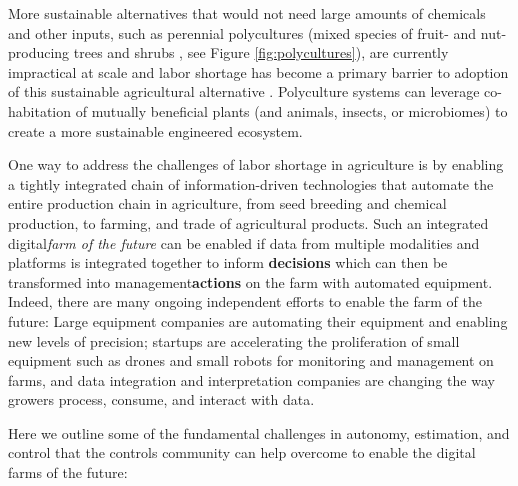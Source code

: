 More sustainable alternatives that would not need large amounts of chemicals and other inputs, such as perennial polycultures (mixed species of fruit- and nut-producing trees and shrubs \cite{lovell2017temperate}, see Figure \ref{fig:polycultures}), are currently impractical at scale and labor shortage has become a primary barrier to adoption of this sustainable agricultural alternative \cite{RN4017,RN4018}. Polyculture systems can leverage co-habitation of mutually beneficial plants (and animals, insects, or microbiomes) to create a more sustainable engineered ecosystem. %


One way to address the challenges of labor shortage in agriculture is by enabling a tightly integrated chain of information-driven technologies that automate the entire production ​chain in agriculture, from seed breeding and chemical production, to farming, and trade of agricultural products. Such an integrated ​digital\textit{farm of the future} can be enabled if ​data from multiple modalities and platforms is integrated together to inform \textbf{​decisions} which can then be transformed into management\textbf{​actions} on the farm with automated equipment. Indeed, there are many ongoing independent efforts to enable the farm of the future: Large equipment companies are automating their equipment and enabling new levels of precision; startups are accelerating the proliferation of small equipment such as drones and small robots for monitoring and management on farms, and data integration and interpretation companies are changing the way growers process, consume, and interact with data.

Here we outline some of the fundamental challenges in autonomy, estimation, and control that the controls community can help overcome to enable the digital farms of the future:

